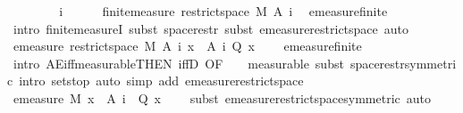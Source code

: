 \begin{isabellebody}
\ \ \isacommand{{\isacharbraceleft}{\kern0pt}}\isamarkupfalse%
\isanewline
\ \ \ \ \isamarkupfalse%
\ i\isanewline
\ \ \ \ \isamarkupfalse%
\ {\isachardoublequoteopen}finite{\isacharunderscore}{\kern0pt}measure\ {\isacharparenleft}{\kern0pt}restrict{\isacharunderscore}{\kern0pt}space\ M\ {\isacharparenleft}{\kern0pt}A\ i{\isacharparenright}{\kern0pt}{\isacharparenright}{\kern0pt}{\isachardoublequoteclose}\ \isamarkupfalse%
\ emeasure{\isacharunderscore}{\kern0pt}finite\ \isamarkupfalse%
\ {\isacharparenleft}{\kern0pt}intro\ finite{\isacharunderscore}{\kern0pt}measureI{\isacharcomma}{\kern0pt}\ subst\ space{\isacharunderscore}{\kern0pt}restr{\isacharcomma}{\kern0pt}\ subst\ emeasure{\isacharunderscore}{\kern0pt}restrict{\isacharunderscore}{\kern0pt}space{\isacharcomma}{\kern0pt}\ auto{\isacharparenright}{\kern0pt}\isanewline
\ \ \ \ \isamarkupfalse%
\ {\isachardoublequoteopen}emeasure\ {\isacharparenleft}{\kern0pt}restrict{\isacharunderscore}{\kern0pt}space\ M\ {\isacharparenleft}{\kern0pt}A\ i{\isacharparenright}{\kern0pt}{\isacharparenright}{\kern0pt}\ {\isacharbraceleft}{\kern0pt}x\ {\isasymin}\ A\ i{\isachardot}{\kern0pt}\ {\isasymnot}Q\ x{\isacharbraceright}{\kern0pt}\ {\isacharequal}{\kern0pt}\ {}{\isachardoublequoteclose}\ \isamarkupfalse%
\ emeasure{\isacharunderscore}{\kern0pt}finite\ \isamarkupfalse%
\ {\isacharparenleft}{\kern0pt}intro\ AE{\isacharunderscore}{\kern0pt}iff{\isacharunderscore}{\kern0pt}measurable{\isacharbrackleft}{\kern0pt}THEN\ iffD{}{\isacharcomma}{\kern0pt}\ OF\ {\isacharunderscore}{\kern0pt}\ {\isacharunderscore}{\kern0pt}\ {\isacharasterisk}{\kern0pt}{\isacharbrackright}{\kern0pt}{\isacharcomma}{\kern0pt}\ measurable{\isacharcomma}{\kern0pt}\ subst\ space{\isacharunderscore}{\kern0pt}restr{\isacharbrackleft}{\kern0pt}symmetric{\isacharbrackright}{\kern0pt}{\isacharcomma}{\kern0pt}\ intro\ sets{\isachardot}{\kern0pt}top{\isacharcomma}{\kern0pt}\ auto\ simp\ add{\isacharcolon}{\kern0pt}\ emeasure{\isacharunderscore}{\kern0pt}restrict{\isacharunderscore}{\kern0pt}space{\isacharparenright}{\kern0pt}\isanewline
\ \ \ \ \isamarkupfalse%
\ {\isachardoublequoteopen}emeasure\ M\ {\isacharbraceleft}{\kern0pt}x\ {\isasymin}\ A\ i{\isachardot}{\kern0pt}\ {\isasymnot}\ Q\ x{\isacharbraceright}{\kern0pt}\ {\isacharequal}{\kern0pt}\ {}{\isachardoublequoteclose}\ \isamarkupfalse%
\ {\isacharparenleft}{\kern0pt}subst\ emeasure{\isacharunderscore}{\kern0pt}restrict{\isacharunderscore}{\kern0pt}space{\isacharbrackleft}{\kern0pt}symmetric{\isacharbrackright}{\kern0pt}{\isacharcomma}{\kern0pt}\ auto{\isacharparenright}{\kern0pt}\isanewline

\end{isabellebody}
